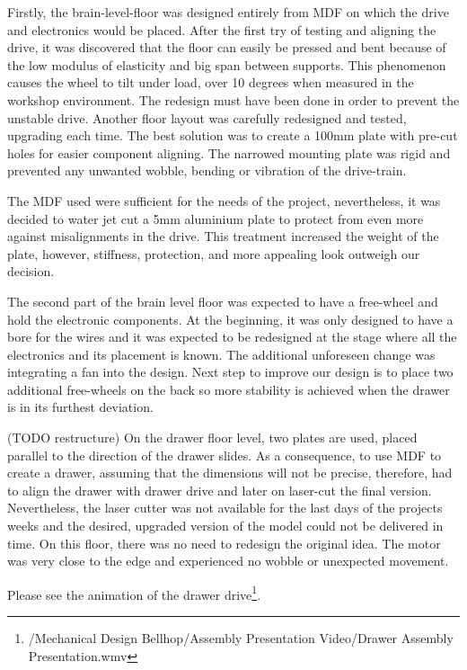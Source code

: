 \documentclass[11pt]{article}
\begin{document}
Firstly, the brain-level-floor was designed entirely from MDF on which the drive and electronics would be placed. After the first try of testing and aligning the drive, it was discovered that the floor can easily be pressed and bent because of the low modulus of elasticity and big span between supports. This phenomenon causes the wheel to tilt under load, over 10 degrees when measured in the workshop environment. The redesign must have been done in order to prevent the unstable drive. Another floor layout was carefully redesigned and tested, upgrading each time. The best solution was to create a 100mm plate with pre-cut holes for easier component aligning. The narrowed mounting plate was rigid and prevented any unwanted wobble, bending or vibration of the drive-train.


The MDF used were sufficient for the needs of the project, nevertheless, it was decided to water jet cut a 5mm aluminium plate to protect from even more against misalignments in the drive. This treatment increased the weight of the plate, however, stiffness, protection, and more appealing look outweigh our decision.


The second part of the brain level floor was expected to have a free-wheel and hold the electronic components. At the beginning, it was only designed to have a bore for the wires and it was expected to be redesigned at the stage where all the electronics and its placement is known. The additional unforeseen change was integrating a fan into the design. Next step to improve our design is to place two additional free-wheels on the back so more stability is achieved when the drawer is in its furthest deviation.


(TODO restructure) On the drawer floor level, two plates are used, placed parallel to the direction of the drawer slides. As a consequence, to use MDF to create a drawer, assuming that the dimensions will not be precise, therefore,  had to align the drawer with drawer drive and later on laser-cut the final version. Nevertheless, the laser cutter was not available for the last days of the projects weeks and the desired, upgraded version of the model could not be delivered in time. On this floor, there was no need to redesign the original idea. The motor was very close to the edge and experienced no wobble or unexpected movement.


Please see the animation of the drawer drive\footnote{/Mechanical Design Bellhop/Assembly Presentation Video/Drawer Assembly Presentation.wmv}.
\end{document}
